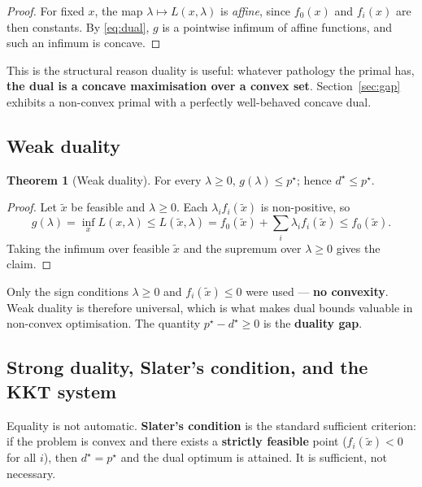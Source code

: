 \documentclass[11pt,a4paper]{article}
\theoremstyle{definition}
\newtheorem{theorem}{Theorem}
\newcommand{\pstar}{p^{\star}}
\newcommand{\dstar}{d^{\star}}
\begin{document}
\begin{proof}
For fixed $x$, the map $\lambda\mapsto L(x,\lambda)$ is \emph{affine}, since $f_{0}(x)$ and
$f_{i}(x)$ are then constants. By \eqref{eq:dual}, $g$ is a pointwise infimum of affine
functions, and such an infimum is concave.
\end{proof}

This is the structural reason duality is useful: whatever pathology the primal has,
\textbf{the dual is a concave maximisation over a convex set}. Section~\ref{sec:gap} exhibits a
non-convex primal with a perfectly well-behaved concave dual.

\subsection{Weak duality}

\begin{theorem}[Weak duality]\label{thm:weak}
For every $\lambda\ge 0$, $g(\lambda)\le\pstar$; hence $\dstar\le\pstar$.
\end{theorem}

\begin{proof}
Let $\tilde{x}$ be feasible and $\lambda\ge 0$. Each $\lambda_{i}f_{i}(\tilde{x})$ is
non-positive, so
\[
g(\lambda)=\inf_{x}L(x,\lambda)\le L(\tilde{x},\lambda)
=f_{0}(\tilde{x})+\sum_{i}\lambda_{i}f_{i}(\tilde{x})\le f_{0}(\tilde{x}).
\]
Taking the infimum over feasible $\tilde{x}$ and the supremum over $\lambda\ge 0$ gives the
claim.
\end{proof}

Only the sign conditions $\lambda\ge 0$ and $f_{i}(\tilde{x})\le 0$ were used ---
\textbf{no convexity}. Weak duality is therefore universal, which is what makes dual bounds
valuable in non-convex optimisation. The quantity $\pstar-\dstar\ge 0$ is the
\textbf{duality gap}.

\subsection{Strong duality, Slater's condition, and the KKT system}

Equality is not automatic. \textbf{Slater's condition} is the standard sufficient criterion: if
the problem is convex and there exists a \textbf{strictly feasible} point
($f_{i}(\tilde{x})<0$ for all $i$), then $\dstar=\pstar$ and the dual optimum is attained. It is
sufficient, not necessary.
\end{document}
